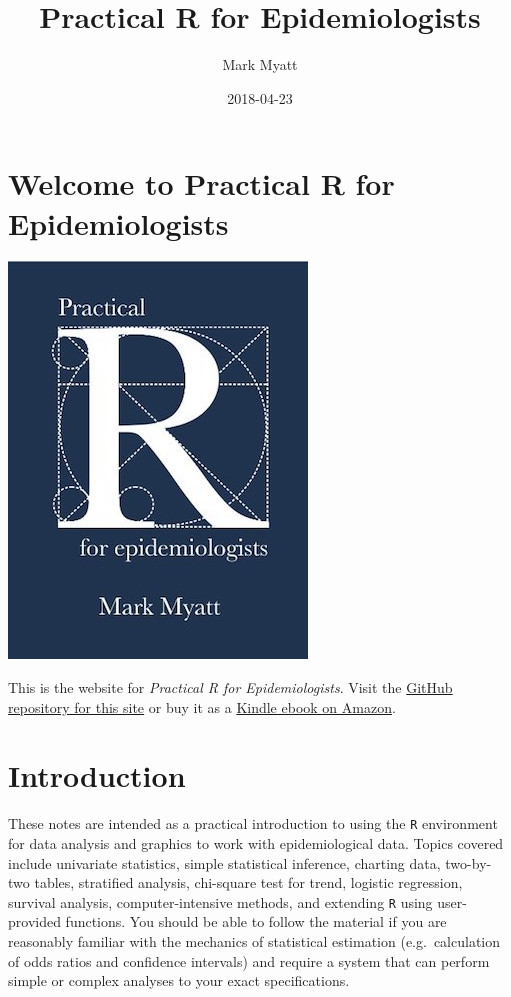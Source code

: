 \documentclass[12pt,]{book}
\title{Practical R for Epidemiologists}
\author{Mark Myatt}
\date{2018-04-23}
\theoremstyle{definition}
\theoremstyle{definition}
\theoremstyle{definition}
\theoremstyle{remark}
\begin{document}
\maketitle

{
\hypersetup{linkcolor=black}
\setcounter{tocdepth}{1}
\tableofcontents
}
\hypertarget{welcome-to-practical-r-for-epidemiologists}{%
\chapter*{Welcome to Practical R for
Epidemiologists}\label{welcome-to-practical-r-for-epidemiologists}}

\includegraphics{images/bookcover_medium.jpg}

This is the website for \emph{Practical R for Epidemiologists}. Visit
the
\href{https://github.com/ernestguevarra/practical-r-for-epidemiologists}{GitHub
repository for this site} or buy it as a
\href{https://www.amazon.co.uk/Practical-R-Epidemiologists-Mark-Myatt-ebook/dp/B00DQATKIE/ref=sr_1_1?ie=UTF8\&qid=1524423427\&sr=8-1\&keywords=practical+r+for+epidemiologists}{Kindle
ebook on Amazon}.

\hypertarget{introduction}{%
\chapter*{Introduction}\label{introduction}}

These notes are intended as a practical introduction to using the
\texttt{R} environment for data analysis and graphics to work with
epidemiological data. Topics covered include univariate statistics,
simple statistical inference, charting data, two-by-two tables,
stratified analysis, chi-square test for trend, logistic regression,
survival analysis, computer-intensive methods, and extending \texttt{R}
using user-provided functions. You should be able to follow the material
if you are reasonably familiar with the mechanics of statistical
estimation (e.g.~calculation of odds ratios and confidence intervals)
and require a system that can perform simple or complex analyses to your
exact specifications.
\end{document}

